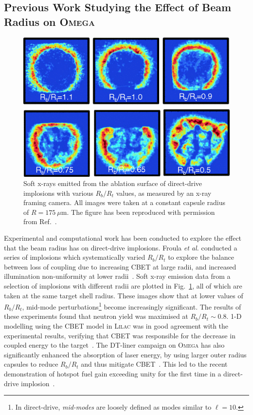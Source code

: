\subsection{Previous Work Studying the Effect of Beam Radius on \textsc{Omega}}%
\label{sec:Res1_OMEGA_stat_modelling_RbRt}

\begin{figure}[t!]
    \includegraphics[width=0.5\linewidth]{Results1/Images/RbRt_froula.png}
    \centering
    \caption{Soft x-rays emitted from the ablation surface of direct-drive implosions with various $R_b/R_t$ values, as measured by an x-ray framing camera.
    All images were taken at a constant capsule radius of $R=175\ \mu\text{m}$.
    The figure has been reproduced with permission from Ref.~\cite{froula_increasing_2012}.}%
    \label{fig:RbRt_froula}
\end{figure}

Experimental and computational work has been conducted to explore the effect that the beam radius has on direct-drive implosions.
Froula \textit{et al.} conducted a series of implosions which systematically varied $R_b/R_t$ to explore the balance between loss of coupling due to increasing \ac{CBET} at large radii, and increased illumination non-uniformity at lower radii~\cite{froula_increasing_2012}.
Soft x-ray emission data from a selection of implosions with different radii are plotted in Fig.~\ref{fig:RbRt_froula}, all of which are taken at the same target shell radius.
These images show that at lower values of $R_b/R_t$, mid-mode perturbations\footnote{In direct-drive, \textit{mid-modes} are loosely defined as modes similar to $\ell=10$.} become increasingly significant.
The results of these experiments found that neutron yield was maximised at $R_b/R_t\sim 0.8$.
1-D modelling using the \ac{CBET} model in \textsc{Lilac} was in good agreement with the experimental results, verifying that \ac{CBET} was responsible for the decrease in coupled energy to the target~\cite{igumenshchev_crossed-beam_2012}.
The DT-liner campaign on \textsc{Omega} has also significantly enhanced the absorption of laser energy, by using larger outer radius capsules to reduce $R_b/R_t$ and thus mitigate \ac{CBET}~\cite{williams_high_2021}.
This led to the recent demonstration of hotspot fuel gain exceeding unity for the first time in a direct-drive implosion~\cite{williams_demonstration_2024}.

